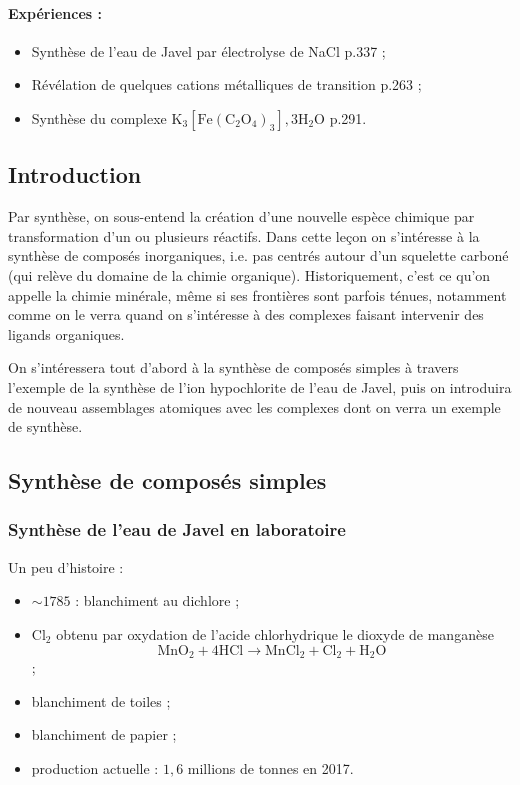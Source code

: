 \paragraph{Expériences :}
\begin{itemize}
\item Synthèse de l'eau de Javel par électrolyse de NaCl \cite{Cachau-Hereillat2011} p.337 ;
\item Révélation de quelques cations métalliques de transition \cite{Buchere2017} p.263 ;
\item Synthèse du complexe $\mathrm{K_3[Fe(C_2O_4)_3],3H_2O}$ \cite{Buchere2017} p.291.
\end{itemize}


\subsection{Introduction}
Par synthèse, on sous-entend la création d'une nouvelle espèce chimique par transformation d'un ou plusieurs réactifs. 
Dans cette leçon on s'intéresse à la synthèse de composés inorganiques, i.e. pas centrés autour d'un squelette carboné (qui relève du domaine de la chimie organique).
Historiquement, c'est ce qu'on appelle la chimie minérale, même si ses frontières sont parfois ténues, notamment comme on le verra quand on s'intéresse à des complexes faisant intervenir des ligands organiques.

On s'intéressera tout d'abord à la synthèse de composés simples à travers l'exemple de la synthèse de l'ion hypochlorite de l'eau de Javel, puis on introduira de nouveau assemblages atomiques avec les complexes dont on verra un exemple de synthèse.

\subsection{Synthèse de composés simples}
\subsubsection{Synthèse de l'eau de Javel en laboratoire}

Un peu d'histoire :
\begin{itemize}
\item $\sim 1785$ : blanchiment au dichlore ;
\item $\mathrm{Cl_2}$ obtenu par oxydation de l'acide chlorhydrique le dioxyde de manganèse $$\mathrm{MnO_2 + 4HCl \rightarrow MnCl_2 + Cl_2 + H_2O}$$;
\item blanchiment de toiles ;
\item blanchiment de papier ;
\item production actuelle : $1,6$ millions de tonnes en 2017.
\end{itemize}

